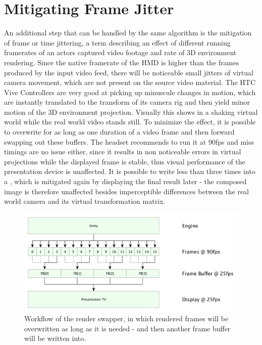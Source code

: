 %
\section{Mitigating Frame Jitter}
\label{sec:framejitter}

An additional step that can be handled by the same algorithm is the mitigation 
of frame or time jittering, a term describing an effect of different running 
framerates of an actors captured video footage and rate of 3D environment 
rendering. Since the native framerate of the HMD is higher than the frames 
produced by the input video feed, there will be noticeable small jitters of 
virtual camera movement, which are not present on the source video material. 
The HTC Vive Controllers are very good at picking up minuscule changes in 
motion, which are instantly translated to the transform of its camera rig and 
then yield minor motion of the 3D environment projection. Visually this shows 
in a shaking virtual world while the real world video stands still.
\newline
To minimize the effect, it is possible to overwrite  for 
as long as one duration of a video frame and then forward swapping out these 
buffers. The headset recommends to run it at 90fps and miss timings are no 
issue either, since it results in non noticeable errors in virtual projections 
while the displayed frame is stable, thus visual performance of the 
presentation device is unaffected. It is possible to write less than three 
times into a , which is mitigated again by displaying the 
final result later - the composed image is therefore unaffected besides 
imperceptible differences between the real world camera and its virtual 
transformation matrix.

\begin{figure}[htb]
	\centering
	\includegraphics[width=\textwidth]{gfx/Delay_Mitigation.pdf}
	\caption{Workflow of the render swapper, in which rendered frames will be 
		overwritten as long as it is needed - and then another frame buffer 
		will be 
		written into.}
	\label{fig:offsets:framesquashing}
\end{figure}

